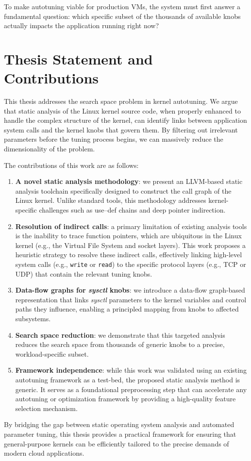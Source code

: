 To make autotuning viable for production VMs, the system must first answer a fundamental question: which specific subset of the thousands of available knobs actually impacts the application running right now?

\section{Thesis Statement and Contributions}

This thesis addresses the search space problem in kernel autotuning.
We argue that static analysis of the Linux kernel source code, when properly enhanced to handle the complex structure of the kernel, can identify links between application system calls and the kernel knobs that govern them.
By filtering out irrelevant parameters before the tuning process begins, we can massively reduce the dimensionality of the problem.

The contributions of this work are as follows:
\begin{enumerate}
    \item \textbf{A novel static analysis methodology}: we present an LLVM-based static analysis toolchain specifically designed to construct the call graph of the Linux kernel. Unlike standard tools, this methodology addresses kernel-specific challenges such as use--def chains and deep pointer indirection.
    \item \textbf{Resolution of indirect calls}: a primary limitation of existing analysis tools is the inability to trace function pointers, which are ubiquitous in the Linux kernel (e.g., the Virtual File System and socket layers). This work proposes a heuristic strategy to resolve these indirect calls, effectively linking high-level system calls (e.g., \texttt{write} or \texttt{read}) to the specific protocol layers (e.g., TCP or UDP) that contain the relevant tuning knobs.
    \item \textbf{Data-flow graphs for \textit{sysctl} knobs}: we introduce a data-flow graph-based representation that links \textit{sysctl} parameters to the kernel variables and control paths they influence, enabling a principled mapping from knobs to affected subsystems.
    \item \textbf{Search space reduction}: we demonstrate that this targeted analysis reduces the search space from thousands of generic knobs to a precise, workload-specific subset.
    \item \textbf{Framework independence}: while this work was validated using an existing autotuning framework as a test-bed, the proposed static analysis method is generic. It serves as a foundational preprocessing step that can accelerate any autotuning or optimization framework by providing a high-quality feature selection mechanism.
\end{enumerate}

By bridging the gap between static operating system analysis and automated parameter tuning, this thesis provides a practical framework for ensuring that general-purpose kernels can be efficiently tailored to the precise demands of modern cloud applications.

\newpage
